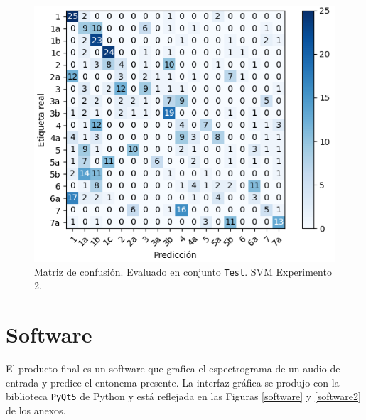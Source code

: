 \begin{figure}
\begin{center}
\includegraphics[width= 0.5\columnwidth]{Graphics/5}
\caption{Matriz de confusi\'on. Evaluado en conjunto \texttt{Test}. SVM Experimento 2.}
\label{mcsvm2}
\end{center}
\end{figure}

\section{Software}
El producto final es un software que grafica el espectrograma de un audio de entrada y predice el entonema presente. La interfaz gr\'afica se produjo con la biblioteca \texttt{PyQt5} de Python y est\'a reflejada en las Figuras \ref{software} y \ref{software2} de los anexos.